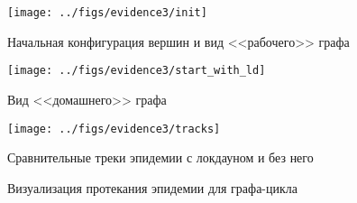 	\begin{figure}[h]
		\begin{center}
			\begin{minipage}{0.49\linewidth}
				\texttt{[image: ../figs/evidence3/init]}
				
				\centering
				Начальная конфигурация вершин и вид <<рабочего>> графа
			\end{minipage}
			\begin{minipage}{0.49\linewidth}
				\texttt{[image: ../figs/evidence3/start\_with\_ld]}
				
				\centering
				Вид <<домашнего>> графа
			\end{minipage}
		\end{center}
		
		\begin{center}
			\begin{minipage}{0.49\linewidth}
				\texttt{[image: ../figs/evidence3/tracks]}
				
				\centering
				Сравнительные треки эпидемии с локдауном и без него
			\end{minipage}
		\end{center}
		
		\caption{Визуализация протекания эпидемии для графа-цикла}\label{pic:evidence_2}
	\end{figure}

	\printbibliography
	
